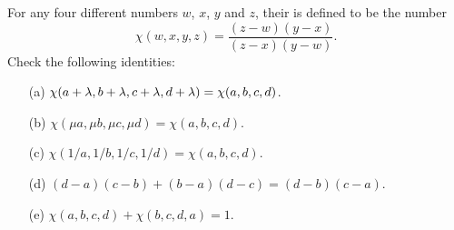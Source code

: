\documentclass[a4paper]{book}
\theoremstyle{definition}
\newenvironment{starex}{
 \renewcommand{\thetheorem}{\arabic{chapter}.\arabic{section}.\arabic{theorem}${}^*$}
 \exercise
}{\endexercise}
\begin{document}
\begin{starex}
 For any four different numbers $w$, $x$, $y$ and $z$, their
   is defined to be 
 the number  
 \[ \chi(w,x,y,z) = \frac{(z-w)(y-x)}{(z-x)(y-w)}. \]
 Check the following identities:
 \begin{itemize}
  \item[(a)] $\chi(a+\lambda,b+\lambda,c+\lambda,d+\lambda)=\chi(a,b,c,d)$.
  \item[(b)] $\chi(\mu a,\mu b,\mu c,\mu d)=\chi(a,b,c,d)$.
  \item[(c)] $\chi(1/a,1/b,1/c,1/d)=\chi(a,b,c,d)$.
  \item[(d)] $(d-a)(c-b)+(b-a)(d-c)=(d-b)(c-a)$.
  \item[(e)] $\chi(a,b,c,d)+\chi(b,c,d,a)=1$. 
 \end{itemize}
\end{starex}
\end{document}

